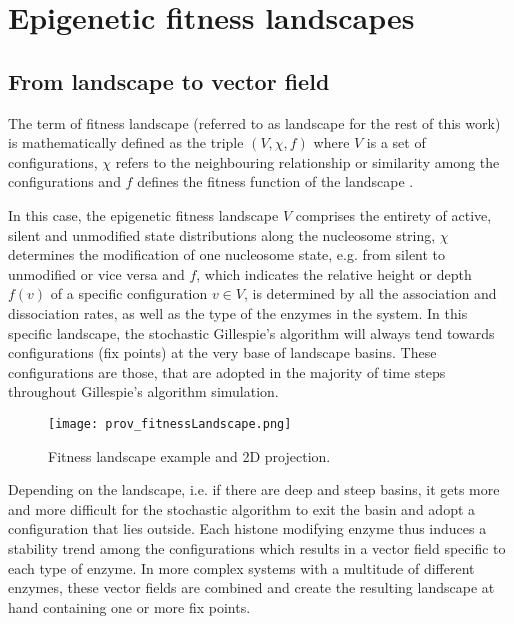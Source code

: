     \section{Epigenetic fitness landscapes} %
        \subsection{From landscape to vector field}
            The term of fitness landscape (referred to as landscape for the rest of this work) is mathematically defined as the triple $(V, \chi, f)$ where $V$ is a set of configurations, $\chi$ refers to the neighbouring relationship or similarity among the configurations and $f$ defines the fitness function of the landscape \source. %

            In this case, the epigenetic fitness landscape $V$ comprises the entirety of active, silent and unmodified state distributions along the nucleosome string, $\chi$ determines the modification of one nucleosome state, e.g. from silent to unmodified or vice versa and $f$, which indicates the relative height or depth $f(v)$ of a specific configuration $v \in V$, is determined by all the association and dissociation rates, as well as the type of the enzymes in the system. In this specific landscape, the stochastic Gillespie's algorithm will always tend towards configurations (fix points) at the very base of landscape basins. These configurations are those, that are adopted in the majority of time steps throughout Gillespie's algorithm simulation.\\

            \begin{figure}[htpb!]
                \centering
                \texttt{[image: prov\_fitnessLandscape.png]}
                \caption{Fitness landscape example and 2D projection.} %
                \label{img:fitnessLandscape}
            \end{figure}

            Depending on the landscape, i.e. if there are deep and steep basins, it gets more and more difficult for the stochastic algorithm to exit the basin and adopt a configuration that lies outside. Each histone modifying enzyme thus induces a stability trend among the configurations which results in a vector field specific to each type of enzyme. In more complex systems with a multitude of different enzymes, these vector fields are combined %
            and create the resulting landscape at hand containing one or more fix points.

